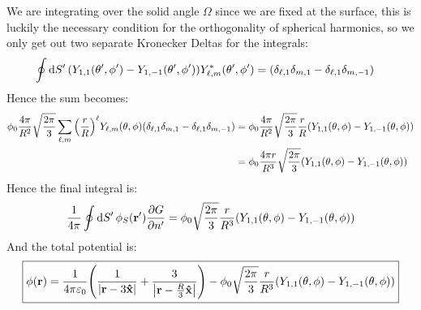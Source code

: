 \documentclass[12pt]{article}
\begin{document}
We are integrating over the solid angle $\Omega$ since we are fixed at the surface, this is luckily the necessary condition for the orthogonality of spherical harmonics, so we only get out two separate Kronecker Deltas for the integrals:
\begin{align*}
  \oint\dd{S'}\qty(Y_{1,1}(\theta',\phi')-Y_{1,-1}(\theta',\phi'))
  Y^*_{\ell,m}(\theta',\phi')&=
  \qty(\delta_{\ell,1}\delta_{m,1}-\delta_{\ell,1}\delta_{m,-1})
\end{align*}
Hence the sum becomes:
\begin{align*}
  \phi_0\frac{4\pi}{R^2}\sqrt{\frac{2\pi}{3}}
  \sum_{\ell,m}\qty(\frac{r}{R})^\ell Y_{\ell,m}(\theta,\phi)
  \qty(\delta_{\ell,1}\delta_{m,1}-\delta_{\ell,1}\delta_{m,-1})&=
  \phi_0\frac{4\pi}{R^2}\sqrt{\frac{2\pi}{3}}\frac{r}{R}
  \qty(Y_{1,1}(\theta,\phi)-Y_{1,-1}(\theta,\phi))\\
  &=\phi_0\frac{4\pi r}{R^3}\sqrt{\frac{2\pi}{3}}
  \qty(Y_{1,1}(\theta,\phi)-Y_{1,-1}(\theta,\phi))
\end{align*}
Hence the final integral is:
\begin{align*}
  \frac1{4\pi}\oint\dd{S'}\phi_S(\vb{r}')\pdv{G}{n'}=
  \phi_0\sqrt{\frac{2\pi}{3}}\frac{r}{R^3}
  \qty(Y_{1,1}(\theta,\phi)-Y_{1,-1}(\theta,\phi))
\end{align*}
And the total potential is:
\begin{align}
  \boxed{\phi(\vb{r})=\frac1{4\pi\varepsilon_0}
    \qty(\frac1{\abs{\vb{r}-3\vu{x}}}
    +\frac{3}{\abs{\vb{r}-\frac{R}{3}\vu{x}}})-
    \phi_0\sqrt{\frac{2\pi}{3}}\frac{r}{R^3}
    \qty(Y_{1,1}(\theta,\phi)-Y_{1,-1}(\theta,\phi))}
\end{align}
\end{document}
